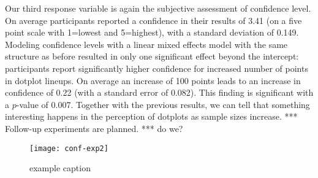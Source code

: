 Our third response variable is again the subjective assessment of confidence level. On average participants reported a confidence in their results of  3.41 (on a five point scale with 1=lowest and 5=highest), with a standard deviation of 0.149. Modeling confidence levels with a linear mixed effects model with the same structure as before resulted in only one significant effect beyond the intercept: participants report significantly higher confidence for increased number of  points in dotplot lineups. On average an increase of 100 points leads to an increase in confidence of 0.22 (with a standard error of 0.082). This finding is significant with a $p$-value of 0.007. 
Together with the previous results, we can tell that something interesting happens in the perception of dotplots as sample sizes increase. 
*** Follow-up experiments are planned. *** do we?

\begin{figure}[htbp] %
   \centering
   \texttt{[image: conf-exp2]} 
   \caption{example caption}
   \label{fig:example}
\end{figure}

